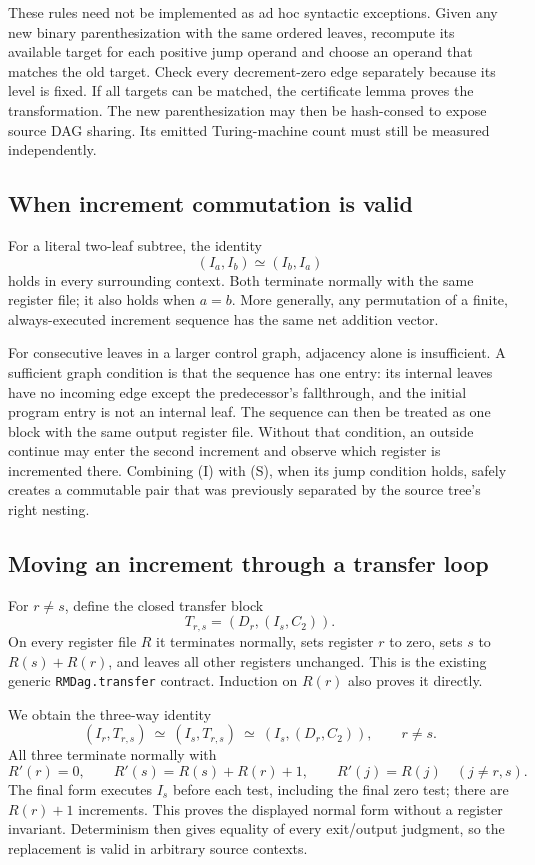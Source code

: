 These rules need not be implemented as ad hoc syntactic exceptions.  Given
any new binary parenthesization with the same ordered leaves, recompute its
available target for each positive jump operand and choose an operand that
matches the old target.  Check every decrement-zero edge separately because
its level is fixed.  If all targets can be matched, the certificate lemma
proves the transformation.  The new parenthesization may then be hash-consed
to expose source DAG sharing.  Its emitted Turing-machine count must still
be measured independently.

\subsection*{When increment commutation is valid}

For a literal two-leaf subtree, the identity
\[
                    (I_a,I_b)\simeq(I_b,I_a)
\tag{S}
\]
holds in every surrounding context.  Both terminate normally with the same
register file; it also holds when $a=b$.  More generally, any permutation of
a finite, always-executed increment sequence has the same net addition
vector.

For consecutive leaves in a larger control graph, adjacency alone is
insufficient.  A sufficient graph condition is that the sequence has one
entry: its internal leaves have no incoming edge except the predecessor's
fallthrough, and the initial program entry is not an internal leaf.  The
sequence can then be treated as one block with the same output register file.
Without that condition, an outside continue may enter the second increment
and observe which register is incremented there.  Combining (I) with (S),
when its jump condition holds, safely creates a commutable pair that was
previously separated by the source tree's right nesting.

\subsection*{Moving an increment through a transfer loop}

For $r\ne s$, define the closed transfer block
\[
 T_{r,s}=(D_r,(I_s,C_2)).
\]
On every register file $R$ it terminates normally, sets register $r$ to zero,
sets $s$ to $R(s)+R(r)$, and leaves all other registers unchanged.  This is
the existing generic \texttt{RMDag.transfer} contract.  Induction on $R(r)$
also proves it directly.

We obtain the three-way identity
\[
 (I_r,T_{r,s})\ \simeq\ (I_s,T_{r,s})
 \ \simeq\ (I_s,(D_r,C_2)),\qquad r\ne s.
\tag{T}
\]
All three terminate normally with
\[
 R'(r)=0,\qquad R'(s)=R(s)+R(r)+1,\qquad
 R'(j)=R(j)\quad(j\ne r,s).
\]
The final form executes $I_s$ before each test, including the final zero test;
there are $R(r)+1$ increments.  This proves the displayed normal form without
a register invariant.  Determinism then gives equality of every exit/output
judgment, so the replacement is valid in arbitrary source contexts.


